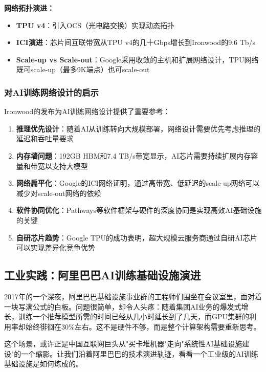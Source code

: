 \textbf{网络拓扑演进：}
\begin{itemize}
    \item \textbf{TPU v4}：引入OCS（光电路交换）实现动态拓扑
    \item \textbf{ICI演进}：芯片间互联带宽从TPU v4的几十Gbps增长到Ironwood的9.6 Tb/s
    \item \textbf{Scale-up vs Scale-out}：Google采用收敛的主机和扩展网络设计，TPU网络既可scale-up（最多9K端点）也可scale-out
\end{itemize}

\subsubsection{对AI训练网络设计的启示}

Ironwood的发布为AI训练网络设计提供了重要参考：

\begin{enumerate}
    \item \textbf{推理优先设计}：随着AI从训练转向大规模部署，网络设计需要优先考虑推理的延迟和吞吐量要求
    
    \item \textbf{内存墙问题}：192GB HBM和7.4 TB/s带宽显示，AI芯片需要持续扩展内存容量和带宽以支持大模型
    
    \item \textbf{网络扁平化}：Google的ICI网络证明，通过高带宽、低延迟的scale-up网络可以减少对scale-out网络的依赖
    
    \item \textbf{软件协同优化}：Pathways等软件框架与硬件的深度协同是实现高效AI基础设施的关键
    
    \item \textbf{自研芯片趋势}：Google TPU的成功表明，超大规模云服务商通过自研AI芯片可以实现差异化竞争优势
\end{enumerate}

\subsection{工业实践：阿里巴巴AI训练基础设施演进}

2017年的一个深夜，阿里巴巴基础设施事业群的工程师们围坐在会议室里，面对着一块写满公式的白板。问题很简单，却令人头疼：随着集团AI业务的爆发式增长，训练一个推荐模型所需的时间已经从几小时延长到了几天，而GPU集群的利用率却始终徘徊在30\%左右。这不是硬件不够，而是整个计算架构需要重新思考。

这个场景，或许正是中国互联网巨头从"买卡堆机器"走向"系统性AI基础设施建设"的一个缩影。让我们沿着阿里巴巴的技术演进轨迹，看看一个工业级的AI训练基础设施是如何炼成的。

